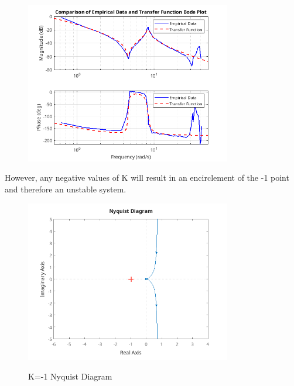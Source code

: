 \documentclass{article}
\begin{document}
\begin{figure}[H]
    \centering
    \includegraphics[width=0.8\textwidth]{analyticTFbode.png}
    \label{fig:analyticTFbodePhaseMargin}
\end{figure}

However, any negative values of K will result in an encirclement of the -1 point and therefore an unstable system.

\begin{figure}[H]
    \centering
    \includegraphics[width=0.8\textwidth]{kNeg1nyquistDiagram.png}
    \label{fig:k-1nyquistDiagram}
    \caption{K=-1 Nyquist Diagram}
\end{figure}
\end{document}
